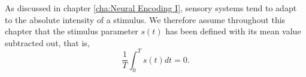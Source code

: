 \begin{asm}
  \label{asm:stimulus}
  As discussed in chapter \ref{cha:Neural Encoding I}, sensory systems tend to adapt to the absolute intensity of a stimulus. We therefore assume throughout this chapter that the stimulus parameter $s(t)$ has been defined with its mean value subtracted out, that is,
  \begin{equation}
    \label{equ:adaptionAssumption}
    \frac{1}{T}\int_0^Ts(t)dt = 0.
  \end{equation}
\end{asm}

